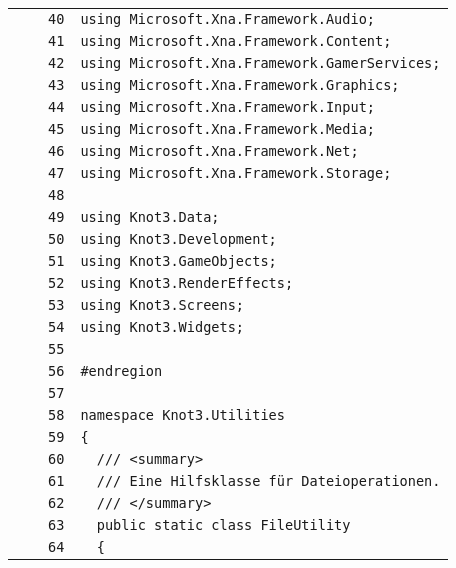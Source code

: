 \documentclass[a4paper,10pt]{article}
\begin{document}
\begin{longtable}[l]{lrrl}
\cellcolor{gray} &  & \verb~40~ & \verb~using Microsoft.Xna.Framework.Audio;~\\
\cellcolor{gray} &  & \verb~41~ & \verb~using Microsoft.Xna.Framework.Content;~\\
\cellcolor{gray} &  & \verb~42~ & \verb~using Microsoft.Xna.Framework.GamerServices;~\\
\cellcolor{gray} &  & \verb~43~ & \verb~using Microsoft.Xna.Framework.Graphics;~\\
\cellcolor{gray} &  & \verb~44~ & \verb~using Microsoft.Xna.Framework.Input;~\\
\cellcolor{gray} &  & \verb~45~ & \verb~using Microsoft.Xna.Framework.Media;~\\
\cellcolor{gray} &  & \verb~46~ & \verb~using Microsoft.Xna.Framework.Net;~\\
\cellcolor{gray} &  & \verb~47~ & \verb~using Microsoft.Xna.Framework.Storage;~\\
\cellcolor{gray} &  & \verb~48~ & \verb~~\\
\cellcolor{gray} &  & \verb~49~ & \verb~using Knot3.Data;~\\
\cellcolor{gray} &  & \verb~50~ & \verb~using Knot3.Development;~\\
\cellcolor{gray} &  & \verb~51~ & \verb~using Knot3.GameObjects;~\\
\cellcolor{gray} &  & \verb~52~ & \verb~using Knot3.RenderEffects;~\\
\cellcolor{gray} &  & \verb~53~ & \verb~using Knot3.Screens;~\\
\cellcolor{gray} &  & \verb~54~ & \verb~using Knot3.Widgets;~\\
\cellcolor{gray} &  & \verb~55~ & \verb~~\\
\cellcolor{gray} &  & \verb~56~ & \verb~#endregion~\\
\cellcolor{gray} &  & \verb~57~ & \verb~~\\
\cellcolor{gray} &  & \verb~58~ & \verb~namespace Knot3.Utilities~\\
\cellcolor{gray} &  & \verb~59~ & \verb~{~\\
\cellcolor{gray} &  & \verb~60~ & \verb~  /// <summary>~\\
\cellcolor{gray} &  & \verb~61~ & \verb~  /// Eine Hilfsklasse für Dateioperationen.~\\
\cellcolor{gray} &  & \verb~62~ & \verb~  /// </summary>~\\
\cellcolor{gray} &  & \verb~63~ & \verb~  public static class FileUtility~\\
\cellcolor{gray} &  & \verb~64~ & \verb~  {~\\

\end{longtable}
\end{document}
